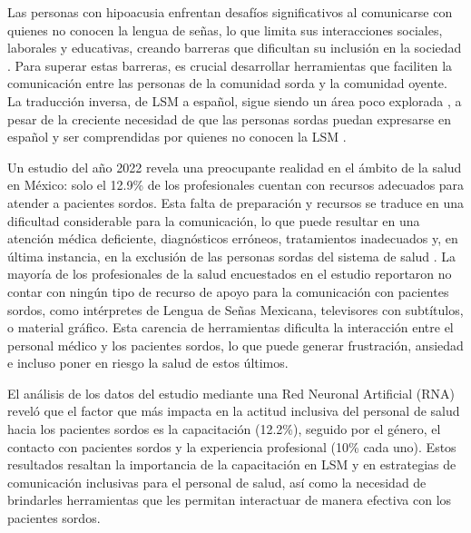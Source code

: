 Las personas con hipoacusia enfrentan desafíos significativos al comunicarse con quienes no conocen la lengua de señas, lo que limita sus interacciones sociales, laborales y educativas, creando barreras que dificultan su inclusión en la sociedad \cite{ref10}.  Para superar estas barreras,  es crucial  desarrollar  herramientas  que  faciliten  la  comunicación  entre  las  personas  de la comunidad sorda  y  la  comunidad  oyente. La  traducción  inversa,  de  LSM  a  español,  sigue  siendo  un  área  poco  explorada  \cite{ref12},  a  pesar  de  la  creciente  necesidad  de  que  las  personas  sordas  puedan  expresarse  en  español  y  ser  comprendidas  por  quienes  no  conocen  la  LSM  \cite{ref6}.

Un  estudio  del año 2022 \cite{ref1}  revela  una  preocupante  realidad  en  el  ámbito  de  la  salud  en  México:  solo  el  12.9\%  de  los  profesionales  cuentan  con  recursos  adecuados  para  atender  a  pacientes  sordos.  Esta  falta  de  preparación  y  recursos  se  traduce  en  una  dificultad  considerable  para  la  comunicación,  lo  que  puede  resultar  en  una  atención  médica  deficiente,  diagnósticos  erróneos,  tratamientos  inadecuados  y,  en  última  instancia,  en  la  exclusión  de  las  personas  sordas  del  sistema  de  salud  \cite{ref2}.  La  mayoría  de  los  profesionales  de  la  salud  encuestados  en  el  estudio  reportaron  no  contar  con  ningún  tipo  de  recurso  de  apoyo  para  la  comunicación  con  pacientes  sordos,  como  intérpretes  de  Lengua  de  Señas  Mexicana,  televisores  con  subtítulos,  o  material  gráfico.  Esta  carencia  de  herramientas  dificulta  la  interacción  entre  el  personal  médico  y  los  pacientes  sordos,  lo  que  puede  generar  frustración,  ansiedad  e  incluso  poner  en  riesgo  la  salud  de  estos  últimos.

El  análisis  de  los  datos  del  estudio  mediante  una  Red  Neuronal  Artificial  (RNA)  \cite{ref1}  reveló  que  el  factor  que  más  impacta  en  la  actitud  inclusiva  del  personal  de  salud  hacia  los  pacientes  sordos  es  la  capacitación  (12.2\%),  seguido  por  el  género,  el  contacto  con  pacientes  sordos  y  la  experiencia  profesional  (10\%  cada  uno).  Estos  resultados  resaltan  la  importancia  de  la  capacitación  en  LSM  y  en  estrategias  de  comunicación  inclusivas  para  el  personal  de  salud,  así  como  la  necesidad  de  brindarles  herramientas  que  les  permitan  interactuar  de  manera  efectiva  con  los  pacientes  sordos.

